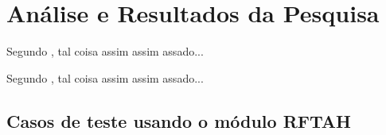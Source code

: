 \chapter{Análise e Resultados da Pesquisa}
Segundo \cite{Abate2008}, tal coisa assim assim assado...

Segundo \cite{Arora1998}, tal coisa assim assim assado...
\section{Casos de teste usando o módulo RFTAH}
